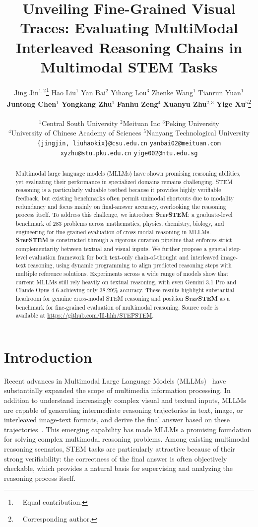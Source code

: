 \documentclass[11pt]{article}
\title{Unveiling Fine-Grained Visual Traces: Evaluating MultiModal Interleaved Reasoning Chains in Multimodal STEM Tasks}
\author{
  Jing Jin$^{1,2}$\thanks{\ \ Equal contribution.} \quad
  Hao Liu$^1$\footnotemark[1] \quad
  Yan Bai$^2$\footnotemark[1] \quad
  Yihang Lou$^3$  \quad
  Zhenke Wang$^1$\quad
  Tianrun Yuan$^1$ \\
  \textbf{Juntong Chen}$^1$ \quad
  \textbf{Yongkang Zhu}$^1$ \quad
  \textbf{Fanhu Zeng}$^4$ \quad
  \textbf{Xuanyu Zhu}$^{2,3}$ \quad
  \textbf{Yige Xu}$^5$\thanks{\ \ Corresponding author.} \\
  \\
  $^1$Central South University  \quad \quad
  $^2$Meituan Inc  \quad \quad
  $^3$Peking University \\
  $^4$University of Chinese Academy of Sciences  \quad \quad
  $^5$Nanyang Technological University \\
  \texttt{\{jingjin, liuhaokix\}@csu.edu.cn} \quad \texttt{yanbai02@meituan.com} \quad \\
  \texttt{xyzhu@stu.pku.edu.cn} \quad
  \texttt{yige002@ntu.edu.sg}
}
\newcommand{\bench}{{\textsc{StepSTEM}}}
\begin{document}
\maketitle

\begin{abstract}
    Multimodal large language models (MLLMs) have shown promising reasoning abilities, yet evaluating their performance in specialized domains remains challenging. STEM reasoning is a particularly valuable testbed because it provides highly verifiable feedback, but existing benchmarks often permit unimodal shortcuts due to modality redundancy and focus mainly on final-answer accuracy, overlooking the reasoning process itself. To address this challenge, we introduce \textbf{\bench}: a graduate-level benchmark of 283 problems across mathematics, physics, chemistry, biology, and engineering for fine-grained evaluation of cross-modal reasoning in MLLMs. \textbf{\bench} is constructed through a rigorous curation pipeline that enforces strict complementarity between textual and visual inputs. We further propose a general step-level evaluation framework for both text-only chain-of-thought and interleaved image-text reasoning, using dynamic programming to align predicted reasoning steps with multiple reference solutions. Experiments across a wide range of models show that current MLLMs still rely heavily on textual reasoning, with even Gemini 3.1 Pro and Claude Opus 4.6 achieving only 38.29\% accuracy. These results highlight substantial headroom for genuine cross-modal STEM reasoning and position \textbf{\bench} as a benchmark for fine-grained evaluation of multimodal reasoning. Source code is available at \url{https://github.com/lll-hhh/STEPSTEM}.
\end{abstract}

\section{Introduction}


Recent advances in Multimodal Large Language Models (MLLMs)~\cite{internvl3,qwen2026qwen35,bagel,janus,emu3,longcat} have substantially expanded the scope of multimedia information processing. In addition to understand increasingly complex visual and textual inputs, MLLMs are capable of generating intermediate reasoning trajectories in text, image, or interleaved image-text formats, and derive the final answer based on these trajectories~\cite{thinkwithimage,zebra,thinkwithgenerateimage}. This emerging capability has made MLLMs a promising foundation for solving complex multimodal reasoning problems. Among existing multimodal reasoning scenarios, STEM tasks are particularly attractive because of their strong verifiability: the correctness of the final answer is often objectively checkable, which provides a natural basis for supervising and analyzing the reasoning process itself.
\end{document}
